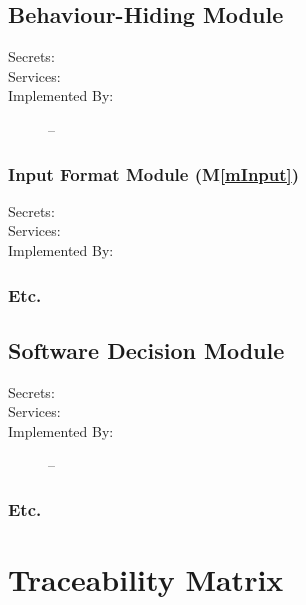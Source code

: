 \documentclass[12pt, titlepage]{article}
\newcommand{\mref}[1]{M\ref{#1}}
\begin{document}
\subsection{Behaviour-Hiding Module}

\begin{description}
\item[Secrets:]
\item[Services:]
\item[Implemented By:] --
\end{description}

\subsubsection{Input Format Module (\mref{mInput})}

\begin{description}
\item[Secrets:]
\item[Services:]
\item[Implemented By:] 
\end{description}

\subsubsection{Etc.}


\subsection{Software Decision Module}

\begin{description}
\item[Secrets:] 
  
\item[Services:]  
\item[Implemented By:] --
\end{description}

\subsubsection{Etc.}

\section{Traceability Matrix} \label{SecTM}
\end{document}
